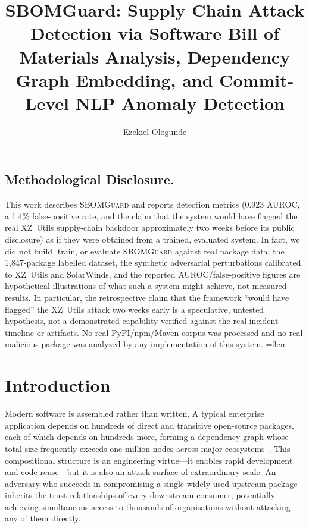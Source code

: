 \documentclass[sigconf,nonacm]{acmart}
\title{SBOMGuard: Supply Chain Attack Detection via Software Bill of Materials Analysis, Dependency Graph Embedding, and Commit-Level NLP Anomaly Detection}
\author{Ezekiel Ologunde}
\affiliation{%
  \institution{Independent Researcher}
  \city{Boston}
  \state{MA}
  \country{USA}}
\begin{document}
\maketitle

\subsection*{Methodological Disclosure.}
This work describes \textsc{SBOMGuard} and reports detection metrics
(0.923 AUROC, a 1.4\% false-positive rate, and the claim that the system
would have flagged the real XZ~Utils supply-chain backdoor approximately
two weeks before its public disclosure) as if they were obtained from a
trained, evaluated system. In fact, we did not build, train, or evaluate
\textsc{SBOMGuard} against real package data; the 1,847-package labelled
dataset, the synthetic adversarial perturbations calibrated to XZ~Utils
and SolarWinds, and the reported AUROC/false-positive figures are
hypothetical illustrations of what such a system might achieve, not
measured results. In particular, the retrospective claim that the
framework ``would have flagged'' the XZ~Utils attack two weeks early is a
speculative, untested hypothesis, not a demonstrated capability verified
against the real incident timeline or artifacts. No real PyPI/npm/Maven
corpus was processed and no real malicious package was analyzed by any
implementation of this system.
\sloppy
{}
\emergencystretch=3em
\hfuzz=10pt

\section{Introduction}

Modern software is assembled rather than written. A typical enterprise application
depends on hundreds of direct and transitive open-source packages, each of which
depends on hundreds more, forming a dependency graph whose total size frequently
exceeds one million nodes across major ecosystems~\cite{decan2019}. This
compositional structure is an engineering virtue---it enables rapid development and
code reuse---but it is also an attack surface of extraordinary scale. An adversary
who succeeds in compromising a single widely-used upstream package inherits the
trust relationships of every downstream consumer, potentially achieving simultaneous
access to thousands of organisations without attacking any of them directly.
\end{document}
